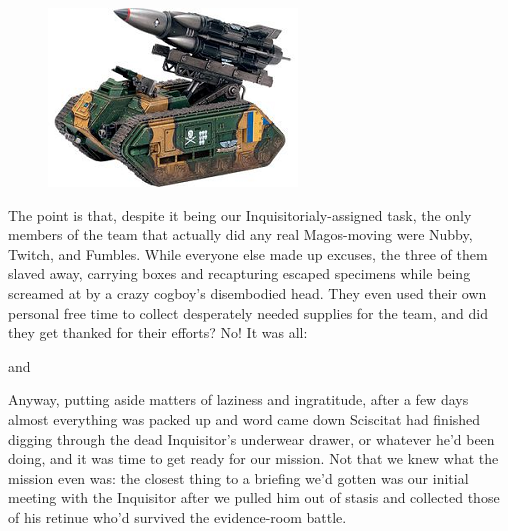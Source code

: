 \begin{figure}
	\begin{center}
		\includegraphics[width=\figwidth]{pics/17/13.png}
	\end{center}
\end{figure}
The point is that, despite it being our Inquisitorialy-assigned task, the only members of the team that actually did any real Magos-moving were Nubby, Twitch, and Fumbles. 
While everyone else made up excuses, the three of them slaved away, carrying boxes and recapturing escaped specimens while being screamed at by a crazy cogboy's disembodied head. 
They even used their own personal free time to collect desperately needed supplies for the team, and did they get thanked for their efforts? 
No! 
It was all: 




and


Anyway, putting aside matters of laziness and ingratitude, after a few days almost everything was packed up and word came down Sciscitat had finished digging through the dead Inquisitor's underwear drawer, or whatever he'd been doing, and it was time to get ready for our mission. 
Not that we knew what the mission even was: 
the closest thing to a briefing we'd gotten was our initial meeting with the Inquisitor after we pulled him out of stasis and collected those of his retinue who'd survived the evidence-room battle.

